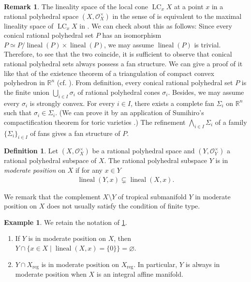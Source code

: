 \documentclass[a4paper,dvipdfmx,reqno,12pt]{amsart}
\theoremstyle{definition}
\newtheorem{definition}[theorem]{Definition}
\newtheorem{example}[theorem]{Example}
\newtheorem{remark}[theorem]{Remark}
\newcommand{\opn}[1]{\operatorname{#1}}
\numberwithin{equation}{section}
\begin{document}
\begin{remark}
The lineality space of the local cone $\opn{LC}_x X$
at a point $x$ in a rational polyhedral space
$(X,\mathcal{O}_X^{\times})$ in the sense of 
\cite[]{MR4246795}
is equivalent to
the maximal lineality space of $\opn{LC}_x X$ in
\cite[]{MR3041763}.
We can check about this as follows:
Since every conical rational polyhedral set $P$ has an isomorphism
$P\simeq P/\opn{lineal}(P)\times \opn{lineal}(P)$, we
may assume $\opn{lineal}(P)$ is trivial.
Therefore, to see that the two coincide,
it is sufficient to observe that 
conical rational polyhedral sets
always possess a fan structure.
We can give a proof of it like
that of the existence theorem
of a triangulation of compact convex polyhedron
in $\mathbb{R}^{n}$ (cf. \cite[Theorem 2.11]{MR665919}).
From definition, every conical rational polyhedral set $P$
is the finite union $\bigcup_{i\in I}\sigma_i$ of 
rational polyhedral cones $\sigma_i$.
Besides, we may assume every $\sigma_i$ is strongly convex.
For every $i\in I$, there exists a
complete fan $\Sigma_i$ on $\mathbb{R}^n$
such that $\sigma_i\in\Sigma_i$.
(We can prove it by an application of Sumihiro's
compactification theorem for toric varieties
\cite[Theorem 3]{MR337963}.)
The refinement $\bigwedge_{i\in I}\Sigma_i$
of a family $\{\Sigma_i\}_{i\in I}$ of fans gives
a fan structure of $P$.
\end{remark}

\begin{definition}
\label{definition-permissible-position}
Let $(X,\mathcal{O}_X^{\times})$
be a rational polyhedral space  and 
$(Y,\mathcal{O}_Y^{\times})$ a
rational polyhedral subspace of $X$.
The rational polyhedral subspace
$Y$ is in \emph{moderate position} on $X$ if
for any $x\in Y$
\begin{align}
     \opn{lineal}(Y,x) \subsetneq
 \opn{lineal}(X,x).
\end{align}
\end{definition}
We remark that
the complement $X\setminus Y$ of tropical submanifold
$Y$ in moderate position on $X$
does not usually satisfy the condition of finite type. 
\begin{example}
We retain the notation of 
\cref{definition-permissible-position}.
\begin{enumerate}
\item If $Y$ is in moderate position on $X$, then
$Y\cap\{x\in X\mid \opn{lineal}(X,x)=\{0\}\}
=\varnothing$.
\item $Y\cap X_{\mathrm{reg}}$ is in 
moderate position on $X_{\mathrm{reg}}$.
In particular, $Y$ is always in moderate position
when $X$ is an integral affine manifold.
\end{enumerate}
\end{example}
\end{document}
